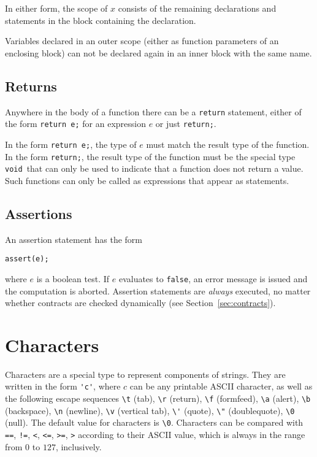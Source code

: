 \documentclass[11pt]{article}
\newcommand{\tvoid}{\texttt{void}}
\begin{document}
In either form, the scope of $x$ consists of the remaining
declarations and statements in the block containing the
declaration.

Variables declared in an outer scope (either as function
parameters of an enclosing block) can not be declared again
in an inner block with the same name.

\subsection{Returns}

Anywhere in the body of a function there can be a \verb'return'
statement, either of the form \verb'return e;' for an expression $e$
or just \verb'return;'.

In the form \verb'return e;', the type of $e$ must match the result
type of the function.  In the form \verb'return;', the result type of
the function must be the special type \tvoid\ that can only be
used to indicate that a function does not return a value.  Such
functions can only be called as expressions that appear as statements.

\subsection{Assertions}

An assertion statement has the form
\begin{verbatim}
assert(e);
\end{verbatim}
where $e$ is a boolean test.  If $e$ evaluates to \verb'false', an
error message is issued and the computation is aborted.  Assertion
statements are \emph{always} executed, no matter whether contracts are
checked dynamically (see Section~\ref{sec:contracts}).

\section{Characters}

Characters are a special type to represent components of strings.
They are written in the form \verb!'c'!, where $c$ can be any printable
ASCII character, as well as the following escape sequences \verb'\t'
(tab), \verb'\r' (return), \verb'\f' (formfeed), \verb'\a' (alert),
\verb'\b' (backspace), \verb'\n' (newline), \verb'\v' (vertical tab),
\verb!\'! (quote), \verb'\"' (doublequote), \verb'\0' (null).  The
default value for characters is \verb'\0'.  Characters can be compared
with \verb'==', \verb'!=', \verb'<', \verb'<=', \verb'>=', \verb'>'
according to their ASCII value, which is always in the range from $0$
to $127$, inclusively.
\end{document}

